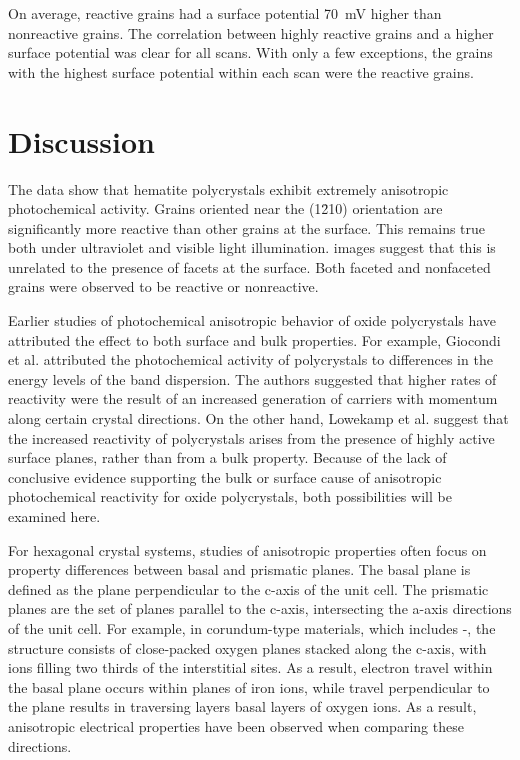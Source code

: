 On average, reactive grains had a surface potential \SI{70}{\milli\volt} higher than nonreactive grains. The correlation between highly reactive grains and a higher surface potential was clear for all scans. With only a few exceptions, the grains with the highest surface potential within each scan were the reactive grains.

\section{Discussion}\label{sec:ch9discussion}

The data show that hematite polycrystals exhibit extremely anisotropic photochemical activity. Grains oriented near the (1\={2}10) orientation are significantly more reactive than other grains at the surface. This remains true both under ultraviolet and visible light illumination.  images suggest that this is unrelated to the presence of facets at the surface. Both faceted and nonfaceted grains were observed to be reactive or nonreactive.

Earlier studies of photochemical anisotropic behavior of oxide polycrystals have attributed the effect to both surface and bulk properties. For example, Giocondi et al.\cite{Giocondi:2007fa} attributed the photochemical activity of  polycrystals to differences in the energy levels of the band dispersion. The authors suggested that higher rates of reactivity were the result of an increased generation of carriers with momentum along certain crystal directions. On the other hand, Lowekamp et al.\cite{Lowekamp:1998ks} suggest that the increased reactivity of  polycrystals arises from the presence of highly active surface planes, rather than from a bulk property. Because of the lack of conclusive evidence supporting the bulk or surface cause of anisotropic photochemical reactivity for oxide polycrystals, both possibilities will be examined here.

For hexagonal crystal systems, studies of anisotropic properties often focus on property differences between basal and prismatic planes. The basal plane is defined as the plane perpendicular to the c-axis of the unit cell. The prismatic planes are the set of planes parallel to the c-axis, intersecting the a-axis directions of the unit cell. For example, in corundum-type materials, which includes \textalpha-, the structure consists of close-packed oxygen planes stacked along the c-axis, with  ions filling two thirds of the interstitial sites. As a result, electron travel within the basal plane occurs within planes of iron ions, while travel perpendicular to the plane results in traversing layers basal layers of oxygen ions.\cite{Iordanova:2005ha} As a result, anisotropic electrical properties have been observed when comparing these directions.\cite{Benjelloun:1984cq}

